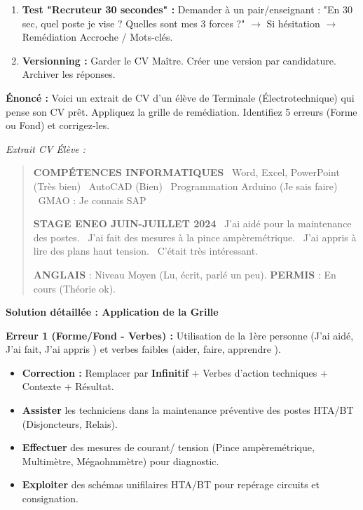 \documentclass[11pt]{article}
\begin{document}
\begin{methode}
\begin{enumerate}
\begin{itemize}
        \end{itemize}
    \item \textbf{Test "Recruteur 30 secondes" :} Demander à un pair/enseignant : "En 30 sec, quel poste je vise ? Quelles sont mes 3 forces ?" $\rightarrow$ Si hésitation $\rightarrow$ Remédiation Accroche / Mots-clés.
    \item \textbf{Versionning :} Garder le CV Maître. Créer une version par candidature. Archiver les réponses.
\end{enumerate}
\end{methode}

\begin{exoresolu}
\textbf{Énoncé :} Voici un extrait de CV d'un élève de Terminale (Électrotechnique) qui pense son CV prêt. Appliquez la grille de remédiation. Identifiez 5 erreurs (Forme ou Fond) et corrigez-les.

\emph{Extrait CV Élève :}
\begin{quote}
\textbf{COMPÉTENCES INFORMATIQUES}
\textbullet\ Word, Excel, PowerPoint (Très bien)
\textbullet\ AutoCAD (Bien)
\textbullet\ Programmation Arduino (Je sais faire)
\textbullet\ GMAO : Je connais SAP

\textbf{STAGE ENEO JUIN-JUILLET 2024}
\textbullet\ J'ai aidé pour la maintenance des postes.
\textbullet\ J'ai fait des mesures à la pince ampèremétrique.
\textbullet\ J'ai appris à lire des plans haut tension.
\textbullet\ C'était très intéressant.

\textbf{ANGLAIS} : Niveau Moyen (Lu, écrit, parlé un peu).
\textbf{PERMIS} : En cours (Théorie ok).
\end{quote}

\tcblower
\textbf{Solution détaillée : Application de la Grille}

\noindent \textbf{Erreur 1 (Forme/Fond - Verbes) :} Utilisation de la 1ère personne (\og J'ai aidé, J'ai fait, J'ai appris \fg) et verbes faibles (\og aider, faire, apprendre \fg).
\begin{itemize}
    \item \textbf{Correction :} Remplacer par \textbf{Infinitif} + Verbes d'action techniques + Contexte + Résultat.
    \item \og \textbf{Assister} les techniciens dans la maintenance préventive des postes HTA/BT (Disjoncteurs, Relais). \fg
    \item \og \textbf{Effectuer} des mesures de courant/ tension (Pince ampèremétrique, Multimètre, Mégaohmmètre) pour diagnostic. \fg
    \item \og \textbf{Exploiter} des schémas unifilaires HTA/BT pour repérage circuits et consignation. \fg
\end{itemize}


\end{exoresolu}
\end{document}
